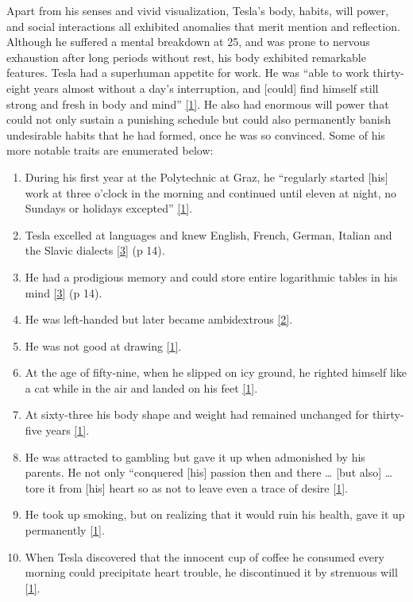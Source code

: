 \documentclass[
  a4paper,
]{article}
\providecommand{\tightlist}{%
  \setlength{\itemsep}{0pt}\setlength{\parskip}{0pt}}
\begin{document}
Apart from his senses and vivid visualization, Tesla's body, habits,
will power, and social interactions all exhibited anomalies that merit
mention and reflection. Although he suffered a mental breakdown at 25,
and was prone to nervous exhaustion after long periods without rest, his
body exhibited remarkable features. Tesla had a superhuman appetite for
work. He was ``able to work thirty-eight years almost without a day's
interruption, and {[}could{]} find himself still strong and fresh in
body and mind'' \protect\hyperlink{ref-john83}{{[}1{]}}. He also had
enormous will power that could not only sustain a punishing schedule but
could also permanently banish undesirable habits that he had formed,
once he was so convinced. Some of his more notable traits are enumerated
below:

\begin{enumerate}
\tightlist
\item
  During his first year at the Polytechnic at Graz, he ``regularly
  started {[}his{]} work at three o'clock in the morning and continued
  until eleven at night, no Sundays or holidays excepted''
  \protect\hyperlink{ref-john83}{{[}1{]}}.
\item
  Tesla excelled at languages and knew English, French, German, Italian
  and the Slavic dialects \protect\hyperlink{ref-cheney81}{{[}3{]}} (p
  14).
\item
  He had a prodigious memory and could store entire logarithmic tables
  in his mind \protect\hyperlink{ref-cheney81}{{[}3{]}} (p 14).
\item
  He was left-handed but later became ambidextrous
  \protect\hyperlink{ref-oneill80}{{[}2{]}}.
\item
  He was not good at drawing \protect\hyperlink{ref-john83}{{[}1{]}}.
\item
  At the age of fifty-nine, when he slipped on icy ground, he righted
  himself like a cat while in the air and landed on his feet
  \protect\hyperlink{ref-john83}{{[}1{]}}.
\item
  At sixty-three his body shape and weight had remained unchanged for
  thirty-five years \protect\hyperlink{ref-john83}{{[}1{]}}.
\item
  He was attracted to gambling but gave it up when admonished by his
  parents. He not only ``conquered {[}his{]} passion then and there
  \ldots{} {[}but also{]} \ldots{} tore it from {[}his{]} heart so as
  not to leave even a trace of desire
  \protect\hyperlink{ref-john83}{{[}1{]}}.
\item
  He took up smoking, but on realizing that it would ruin his health,
  gave it up permanently \protect\hyperlink{ref-john83}{{[}1{]}}.
\item
  When Tesla discovered that the innocent cup of coffee he consumed
  every morning could precipitate heart trouble, he discontinued it by
  strenuous will \protect\hyperlink{ref-john83}{{[}1{]}}.
\end{enumerate}
\end{document}
